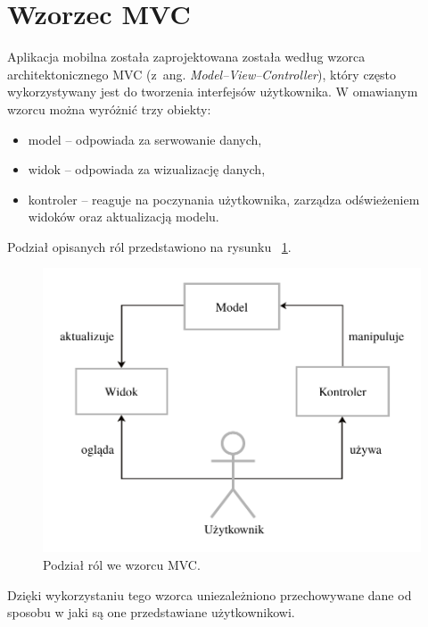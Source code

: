 \section{Wzorzec MVC}
Aplikacja mobilna została zaprojektowana została według wzorca architektonicznego MVC (z~ang. \textit{Model–View–Controller}), który często wykorzystywany jest do tworzenia interfejsów użytkownika. W omawianym wzorcu można wyróżnić trzy obiekty:
\begin{itemize}
\item model – odpowiada za serwowanie danych,
\item widok – odpowiada za wizualizację danych, 
\item kontroler – reaguje na poczynania użytkownika, zarządza odświeżeniem widoków oraz aktualizacją modelu. 
\end{itemize}
Podział opisanych ról przedstawiono na rysunku ~\ref{fig:mvc}.
\begin{figure}[H]
	\centering
		\includegraphics[width=0.75\linewidth]{pic05/mvc.pdf}
	\caption{Podział ról we wzorcu MVC.}
	\label{fig:mvc}	
\end{figure}

Dzięki wykorzystaniu tego wzorca uniezależniono przechowywane dane od sposobu w jaki są one przedstawiane użytkownikowi.

